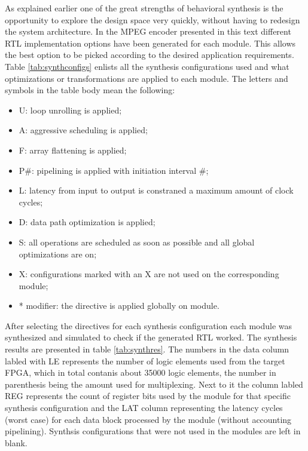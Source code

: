 As explained earlier one of the great strengths of behavioral synthesis is the opportunity to explore the design space very quickly, without having to redesign the system architecture. In the MPEG encoder presented in this text different RTL implementation options have been generated for each module. 
This allows the best option to be picked according to the desired application requirements. Table \ref{tab:synthconfigs} enlists all the synthesis configurations used and what optimizations or transformations are applied to each module. The letters and symbols in the table body mean the following:
\begin{itemize}
\item U: loop unrolling is applied;
\item A: aggressive scheduling is applied;
\item F: array flattening is applied;
\item P\#: pipelining is applied with initiation interval \#;
\item L: latency from input to output is constraned a maximum amount of clock cycles;
\item D: data path optimization is applied;
\item S: all operations are scheduled as soon as possible and all global optimizations are on;
\item X: configurations marked with an X are not used on the corresponding module;
\item * modifier: the directive is applied globally on module.
\end{itemize}

After selecting the directives for each synthesis configuration each module was synthesized and simulated to check if the generated RTL worked. The synthesis results are presented in table \ref{tab:synthres}. The numbers in the data column labled with LE represents the number of logic elements used from the target FPGA, which in total contanis about 35000 logic elements, the number in parenthesis being the amount used for multiplexing. Next to it the column labled REG represents the count of register bits used by the module for that specific synthesis configuration and the LAT column representing the latency cycles (worst case) for each data block processed by the module (without accounting pipelining). Synthsis configurations that were not used in the modules are left in blank.

